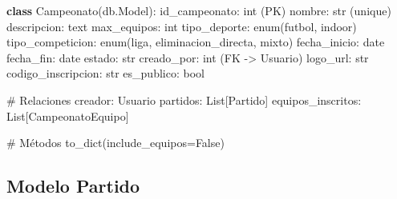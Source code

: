 \documentclass[
  spanish,
  11pt,
  letterpaper,
]{book}
\newenvironment{Shaded}{\begin{snugshade}}{\end{snugshade}}
\newcommand{\BuiltInTok}[1]{\textcolor[rgb]{0.00,0.23,0.31}{#1}}
\newcommand{\CommentTok}[1]{\textcolor[rgb]{0.37,0.37,0.37}{#1}}
\newcommand{\KeywordTok}[1]{\textcolor[rgb]{0.00,0.23,0.31}{\textbf{#1}}}
\newcommand{\NormalTok}[1]{\textcolor[rgb]{0.00,0.23,0.31}{#1}}
\newcommand{\OperatorTok}[1]{\textcolor[rgb]{0.37,0.37,0.37}{#1}}
\newcommand{\StringTok}[1]{\textcolor[rgb]{0.13,0.47,0.30}{#1}}
\newcommand{\VariableTok}[1]{\textcolor[rgb]{0.07,0.07,0.07}{#1}}
\begin{document}
\begin{Shaded}
\begin{Highlighting}[]
\KeywordTok{class}\NormalTok{ Campeonato(db.Model):}
\NormalTok{    id\_campeonato: }\BuiltInTok{int}\NormalTok{ (PK)}
\NormalTok{    nombre: }\BuiltInTok{str}\NormalTok{ (unique)}
\NormalTok{    descripcion: text}
\NormalTok{    max\_equipos: }\BuiltInTok{int}
\NormalTok{    tipo\_deporte: enum(}\StringTok{\textquotesingle{}futbol\textquotesingle{}}\NormalTok{, }\StringTok{\textquotesingle{}indoor\textquotesingle{}}\NormalTok{)}
\NormalTok{    tipo\_competicion: enum(}\StringTok{\textquotesingle{}liga\textquotesingle{}}\NormalTok{, }\StringTok{\textquotesingle{}eliminacion\_directa\textquotesingle{}}\NormalTok{, }\StringTok{\textquotesingle{}mixto\textquotesingle{}}\NormalTok{)}
\NormalTok{    fecha\_inicio: date}
\NormalTok{    fecha\_fin: date}
\NormalTok{    estado: }\BuiltInTok{str}
\NormalTok{    creado\_por: }\BuiltInTok{int}\NormalTok{ (FK }\OperatorTok{{-}\textgreater{}}\NormalTok{ Usuario)}
\NormalTok{    logo\_url: }\BuiltInTok{str}
\NormalTok{    codigo\_inscripcion: }\BuiltInTok{str}
\NormalTok{    es\_publico: }\BuiltInTok{bool}
    
    \CommentTok{\# Relaciones}
\NormalTok{    creador: Usuario}
\NormalTok{    partidos: List[Partido]}
\NormalTok{    equipos\_inscritos: List[CampeonatoEquipo]}
    
    \CommentTok{\# Métodos}
\NormalTok{    to\_dict(include\_equipos}\OperatorTok{=}\VariableTok{False}\NormalTok{)}
\end{Highlighting}
\end{Shaded}

\subsection{Modelo Partido}\label{modelo-partido}
\end{document}
